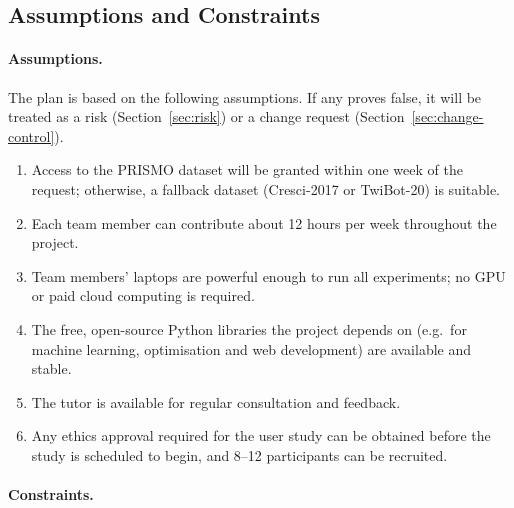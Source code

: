 \subsection{Assumptions and Constraints}\label{sec:assumptions}

\paragraph{Assumptions.} The plan is based on the following assumptions. If any proves false, it will be treated as a risk (Section~\ref{sec:risk}) or a change request (Section~\ref{sec:change-control}).

\begin{enumerate}[label=\textbf{A\arabic*}, leftmargin=2.5em, nosep]
  \item Access to the PRISMO dataset will be granted within one week of the request; otherwise, a fallback dataset (Cresci-2017 or TwiBot-20) is suitable.
  \item Each team member can contribute about 12 hours per week throughout the project.
  \item Team members' laptops are powerful enough to run all experiments; no GPU or paid cloud computing is required.
  \item The free, open-source Python libraries the project depends on (e.g.\ for machine learning, optimisation and web development) are available and stable.
  \item The tutor is available for regular consultation and feedback.
  \item Any ethics approval required for the user study can be obtained before the study is scheduled to begin, and 8--12 participants can be recruited.
\end{enumerate}

\paragraph{Constraints.}

